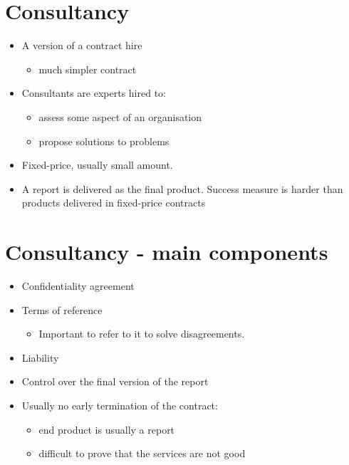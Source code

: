 \documentclass{article}
\begin{document}
\section{Consultancy}
\begin{itemize}
\item A version of a contract hire
\begin{itemize}
\item much simpler contract
\end{itemize}
\item Consultants are experts hired to:
\begin{itemize}
\item assess some aspect of an organisation
\item propose solutions to problems
\end{itemize}
\item Fixed-price, usually small amount.
\item A report is delivered as the final product. Success measure is harder than products delivered in fixed-price contracts
\end{itemize}



\section{Consultancy - main components}
\begin{itemize}
\item Confidentiality agreement 
\item Terms of reference
\begin{itemize}
\item Important to refer to it to solve disagreements.
\end{itemize}
\item Liability
\item Control over the final version of the report
\item Usually no early termination of the contract:
\begin{itemize}
\item end product is usually a report 
\item difficult to prove that the services are not good
\end{itemize}
\end{itemize}
\end{document}
